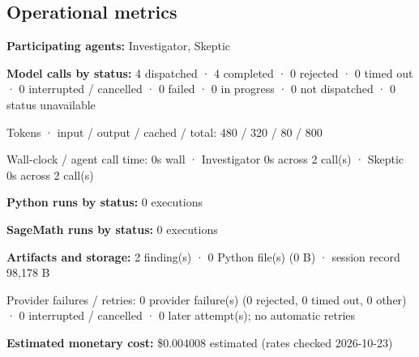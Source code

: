 \documentclass[11pt]{article}
\begin{document}
\subsection{Operational metrics}
\textbf{Participating agents:} Investigator, Skeptic\par
\textbf{Model calls by status:} 4 dispatched · 4 completed · 0 rejected · 0 timed out · 0 interrupted / cancelled · 0 failed · 0 in progress · 0 not dispatched · 0 status unavailable\par
Tokens · input / output / cached / total: 480 / 320 / 80 / 800\par
Wall-clock / agent call time: 0s wall · Investigator 0s across 2 call(s) · Skeptic 0s across 2 call(s)\par
\textbf{Python runs by status:} 0 executions\par
\textbf{SageMath runs by status:} 0 executions\par
\textbf{Artifacts and storage:} 2 finding(s) · 0 Python file(s) (0 B) · session record 98,178 B\par
Provider failures / retries: 0 provider failure(s) (0 rejected, 0 timed out, 0 other) · 0 interrupted / cancelled · 0 later attempt(s); no automatic retries\par
\textbf{Estimated monetary cost:} \$0.004008 estimated (rates checked 2026-10-23)\par
\end{document}
